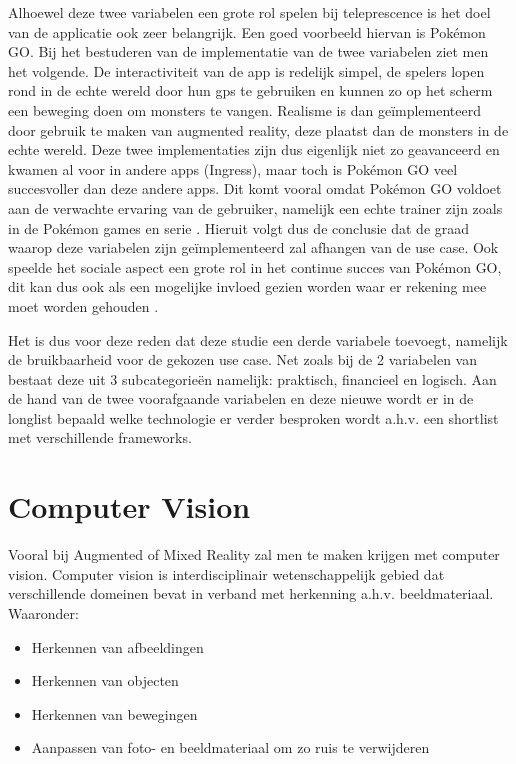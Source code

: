 Alhoewel deze twee variabelen een grote rol spelen bij teleprescence is het doel van de applicatie ook zeer belangrijk. Een goed voorbeeld hiervan is Pokémon GO. Bij het bestuderen van de implementatie van de twee variabelen ziet men het volgende. De interactiviteit van de app is redelijk simpel, de spelers lopen rond in de echte wereld door hun gps te gebruiken en kunnen zo op het scherm een beweging doen om monsters te vangen. Realisme is dan geïmplementeerd door gebruik te maken van augmented reality, deze plaatst dan de monsters in de echte wereld. Deze twee implementaties zijn dus eigenlijk niet zo geavanceerd en kwamen al voor in andere apps (Ingress), maar toch is Pokémon GO veel succesvoller dan deze andere apps. Dit komt vooral omdat Pokémon GO voldoet aan de verwachte ervaring van de gebruiker, namelijk een echte trainer zijn zoals in de Pokémon games en serie \autocite{Tang2017}. Hieruit volgt dus de conclusie dat de graad waarop deze variabelen zijn geïmplementeerd zal afhangen van de use case. Ook speelde het sociale aspect een grote rol in het continue succes van Pokémon GO, dit kan dus ook als een mogelijke invloed gezien worden waar er rekening mee moet worden gehouden \autocite{Tang2017}.


Het is dus voor deze reden dat deze studie een derde variabele toevoegt, namelijk de bruikbaarheid voor de gekozen use case. Net zoals bij de 2 variabelen van \textcite{Steuer1992} bestaat deze uit 3 subcategorieën namelijk: praktisch, financieel en logisch. Aan de hand van de twee voorafgaande variabelen en deze nieuwe wordt er in de longlist bepaald welke technologie er verder besproken wordt a.h.v. een shortlist met verschillende frameworks. 

\section{Computer Vision}
Vooral bij Augmented of Mixed Reality zal men te maken krijgen met computer vision. Computer vision is interdisciplinair wetenschappelijk gebied dat verschillende domeinen bevat in verband met herkenning a.h.v. beeldmateriaal. Waaronder: 

\begin{itemize}
    \item Herkennen van afbeeldingen
    \item Herkennen van objecten
    \item Herkennen van bewegingen
    \item Aanpassen van foto- en beeldmateriaal om zo ruis te verwijderen
\end{itemize}

